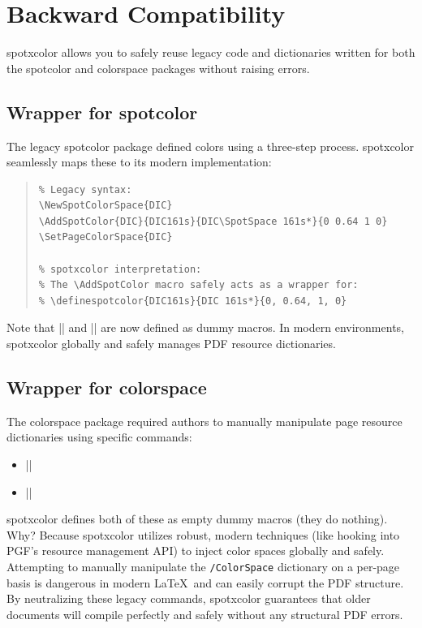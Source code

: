 \documentclass[luatex]{article}\listfiles
\begin{document}
\section{Backward Compatibility}

\textsf{spotxcolor} allows you to safely reuse legacy code and dictionaries written for both the \textsf{spotcolor} and \textsf{colorspace} packages without raising errors.

\subsection{Wrapper for \textsf{spotcolor}}
The legacy \textsf{spotcolor} package defined colors using a three-step process.
\textsf{spotxcolor} seamlessly maps these to its modern implementation:

\begin{quote}
\begin{verbatim}
% Legacy syntax:
\NewSpotColorSpace{DIC}
\AddSpotColor{DIC}{DIC161s}{DIC\SpotSpace 161s*}{0 0.64 1 0}
\SetPageColorSpace{DIC}

% spotxcolor interpretation:
% The \AddSpotColor macro safely acts as a wrapper for:
% \definespotcolor{DIC161s}{DIC 161s*}{0, 0.64, 1, 0}
\end{verbatim}
\end{quote}
Note that |\NewSpotColorSpace|
and |\SetPageColorSpace| are now defined as dummy macros. In modern environments, \textsf{spotxcolor} globally and safely manages PDF resource dictionaries.

\subsection{Wrapper for \textsf{colorspace}}
The \textsf{colorspace} package required authors to manually manipulate page resource dictionaries using specific commands:

\begin{itemize}
\item ||
\item |\resetpagecolorspace|
\end{itemize}

\textsf{spotxcolor} defines both of these as empty dummy macros (they do nothing).
Why?
Because \textsf{spotxcolor} utilizes robust, modern techniques (like hooking into PGF's resource management API) to inject color spaces globally and safely.
Attempting to manually manipulate the \texttt{/ColorSpace} dictionary on a per-page basis is dangerous in modern \LaTeX\ and can easily corrupt the PDF structure.
By neutralizing these legacy commands, \textsf{spotxcolor} guarantees that older documents will compile perfectly and safely without any structural PDF errors.
\end{document}
